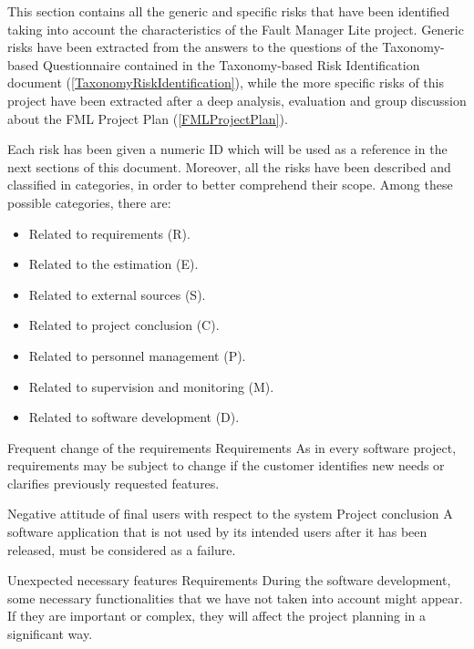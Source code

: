 
This section contains all the generic and specific risks that have been identified taking into account the characteristics of the Fault Manager Lite project. Generic risks have been extracted from the answers to the questions of the Taxonomy-based Questionnaire contained in the Taxonomy-based Risk Identification document (\ref{TaxonomyRiskIdentification}), while the more specific risks of this project have been extracted after a deep analysis, evaluation and group discussion about the FML Project Plan (\ref{FMLProjectPlan}). 

Each risk has been given a numeric ID which will be used as a reference in the next sections of this document. Moreover, all the risks have been described and classified in categories, in order to better comprehend their scope.
Among these possible categories, there are: 
\begin{itemize}
\item Related to requirements (R).
\item Related to the estimation (E).
\item Related to external sources (S).
\item Related to project conclusion (C).
\item Related to personnel management (P).
\item Related to supervision and monitoring (M).
\item Related to software development (D).
\end{itemize}

\begin{risk}{Frequent change of the requirements}
\riskcat Requirements
\riskdesc As in every software project, requirements may be subject to change if the customer identifies new needs or clarifies previously requested features.
\end{risk}

\begin{risk}{Negative attitude of final users with respect to the system}
\riskcat Project conclusion
\riskdesc A software application that is not used by its intended users after it has been released, must be considered as a failure. 
\end{risk}

\begin{risk}{Unexpected necessary features}
\riskcat Requirements
\riskdesc During the software development, some necessary functionalities that we have not taken into account might appear. If they are important or complex, they will affect the project planning in a significant way.
\end{risk}

